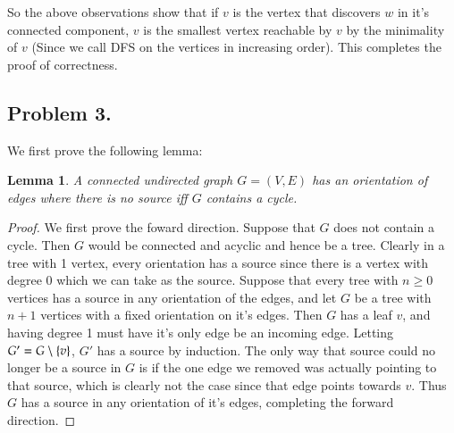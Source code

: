 \documentclass[12pt]{article}
\newtheorem{lemma}{Lemma}
\theoremstyle{definitionstyle}
\newcommand{\SET}[1]{\Set{\mskip-\medmuskip #1 \mskip-\medmuskip}}
\begin{document}
    So the above observations show that if $v$ is the vertex that discovers $w$ in it's connected component, $v$ is the smallest vertex reachable by $v$ by the minimality of $v$ (Since we call DFS on the vertices in increasing order). This completes the proof of correctness.


    \subsection*{Problem 3.} 
    We first prove the following lemma:
    \begin{lemma}
        A connected undirected graph $G = (V,E)$ has an orientation of edges where there is no source iff $G$ contains a cycle.
    \end{lemma}
    \begin{proof}
        We first prove the foward direction. Suppose that $G$ does not contain a cycle. Then $G$ would be connected and acyclic and hence be a tree. Clearly in a tree with 1 vertex, every orientation has a source since there is a vertex with degree 0 which we can take as the source. Suppose that every tree with $n \geq 0$ vertices has a source in any orientation of the edges, and let $G$ be a tree with $n+1$ vertices with a fixed orientation on it's edges. Then $G$ has a leaf $v$, and having degree 1 must have it's only edge be an incoming edge. Letting $G' = G \setminus \SET{v}$, $G'$ has a source by induction. The only way that source could no longer be a source in $G$ is if the one edge we removed was actually pointing to that source, which is clearly not the case since that edge points towards $v$. Thus $G$ has a source in any orientation of it's edges, completing the forward direction.


\end{proof}
\end{document}
